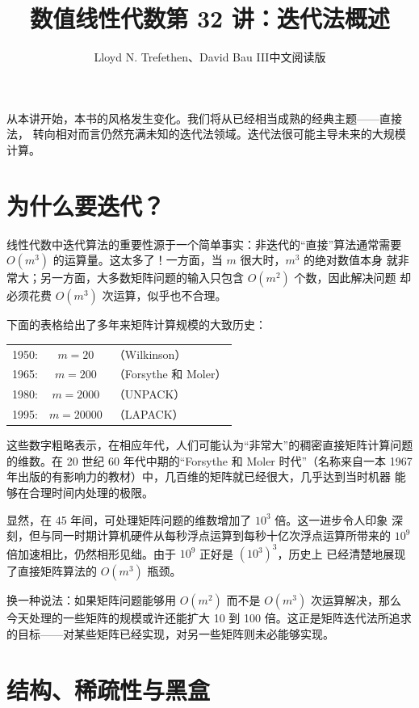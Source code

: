 \documentclass[UTF8,fontset=none,12pt]{ctexart}
\title{数值线性代数\quad 第 32 讲：迭代法概述}
\author{Lloyd N. Trefethen、David Bau III\quad 中文阅读版}
\date{}
\begin{document}
\maketitle
\pagestyle{plain}

从本讲开始，本书的风格发生变化。我们将从已经相当成熟的经典主题——直接法，
转向相对而言仍然充满未知的迭代法领域。迭代法很可能主导未来的大规模计算。

\section*{为什么要迭代？}

线性代数中迭代算法的重要性源于一个简单事实：非迭代的“直接”算法通常需要
$O(m^3)$ 的运算量。这太多了！一方面，当 $m$ 很大时，$m^3$ 的绝对数值本身
就非常大；另一方面，大多数矩阵问题的输入只包含 $O(m^2)$ 个数，因此解决问题
却必须花费 $O(m^3)$ 次运算，似乎也不合理。

下面的表格给出了多年来矩阵计算规模的大致历史：

\begin{center}
\begin{tabular}{rcl}
1950: & $m=20$ &（Wilkinson）\\
1965: & $m=200$ &（Forsythe 和 Moler）\\
1980: & $m=2000$ &（UNPACK）\\
1995: & $m=20000$ &（LAPACK）
\end{tabular}
\end{center}

这些数字粗略表示，在相应年代，人们可能认为“非常大”的稠密直接矩阵计算问题
的维数。在 20 世纪 60 年代中期的“Forsythe 和 Moler 时代”（名称来自一本
1967 年出版的有影响力的教材）中，几百维的矩阵就已经很大，几乎达到当时机器
能够在合理时间内处理的极限。

显然，在 45 年间，可处理矩阵问题的维数增加了 $10^3$ 倍。这一进步令人印象
深刻，但与同一时期计算机硬件从每秒浮点运算到每秒十亿次浮点运算所带来的
$10^9$ 倍加速相比，仍然相形见绌。由于 $10^9$ 正好是 $(10^3)^3$，历史上
已经清楚地展现了直接矩阵算法的 $O(m^3)$ 瓶颈。

换一种说法：如果矩阵问题能够用 $O(m^2)$ 而不是 $O(m^3)$ 次运算解决，那么
今天处理的一些矩阵的规模或许还能扩大 10 到 100 倍。这正是矩阵迭代法所追求
的目标——对某些矩阵已经实现，对另一些矩阵则未必能够实现。

\section*{结构、稀疏性与黑盒}
\end{document}
